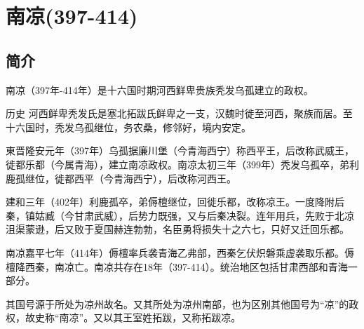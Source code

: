 

\section{南凉\tiny(397-414)}

\subsection{简介}

南凉（397年-414年）是十六国时期河西鲜卑贵族秃发乌孤建立的政权。

历史
河西鲜卑秃发氏是塞北拓跋氏鲜卑之一支，汉魏时徙至河西，聚族而居。至十六国时，秃发乌孤继位，务农桑，修邻好，境内安定。

東晋隆安元年（397年）乌孤据廉川堡（今青海西宁）称西平王，后改称武威王，徙都乐都（今属青海），建立南凉政权。南凉太初三年（399年）秃发乌孤卒，弟利鹿孤继位，徙都西平（今青海西宁），后改称河西王。

建和三年（402年）利鹿孤卒，弟傉檀继位，回徙乐都，改称凉王。一度降附后秦，镇姑臧（今甘肃武威），后势力既强，又与后秦决裂。连年用兵，先败于北凉沮渠蒙逊，后又败于夏国赫连勃勃，名臣勇将损失十之六七，只好又迁回乐都。

南凉嘉平七年（414年）傉檀率兵袭青海乙弗部，西秦乞伏炽磐乘虚袭取乐都。傉檀降西秦，南凉亡。南凉共存在18年（397-414）。统治地区包括甘肃西部和青海一部分。

其国号源于所处为凉州故名。又其所处为凉州南部，也为区别其他国号为“凉”的政权，故史称“南凉”。又以其王室姓拓跋，又称拓跋凉。






